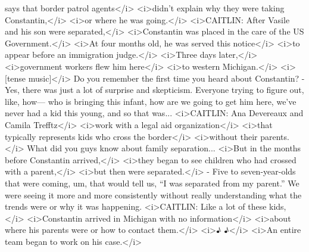 \begin{itemize}
  says that border patrol agents\textless{}/i\textgreater{}
  \textless{}i\textgreater{}didn't explain why they were taking
  Constantin,\textless{}/i\textgreater{} \textless{}i\textgreater{}or
  where he was going.\textless{}/i\textgreater{}
  \textless{}i\textgreater{}CAITLIN: After Vasile and his son were
  separated,\textless{}/i\textgreater{}
  \textless{}i\textgreater{}Constantin was placed in the care of the US
  Government.\textless{}/i\textgreater{} \textless{}i\textgreater{}At
  four months old, he was served this notice\textless{}/i\textgreater{}
  \textless{}i\textgreater{}to appear before an immigration
  judge.\textless{}/i\textgreater{} \textless{}i\textgreater{}Three days
  later,\textless{}/i\textgreater{} \textless{}i\textgreater{}government
  workers flew him here\textless{}/i\textgreater{}
  \textless{}i\textgreater{}to western
  Michigan.\textless{}/i\textgreater{}
  \textless{}i\textgreater{}{[}tense music{]}\textless{}/i\textgreater{}
  Do you remember the first time you heard about Constantin? - Yes,
  there was just a lot of surprise and skepticism. Everyone trying to
  figure out, like, how--- who is bringing this infant, how are we going
  to get him here, we've never had a kid this young, and so that was...
  \textless{}i\textgreater{}CAITLIN: Ana Devereaux and Camila
  Trefftz\textless{}/i\textgreater{} \textless{}i\textgreater{}work with
  a legal aid organization\textless{}/i\textgreater{}
  \textless{}i\textgreater{}that typically represents kids who cross the
  border\textless{}/i\textgreater{} \textless{}i\textgreater{}without
  their parents.\textless{}/i\textgreater{} What did you guys know about
  family separation... \textless{}i\textgreater{}But in the months
  before Constantin arrived,\textless{}/i\textgreater{}
  \textless{}i\textgreater{}they began to see children who had crossed
  with a parent,\textless{}/i\textgreater{}
  \textless{}i\textgreater{}but then were
  separated.\textless{}/i\textgreater{} - Five to seven-year-olds that
  were coming, um, that would tell us, ``I was separated from my
  parent.'' We were seeing it more and more consistently without really
  understanding what the trends were or why it was happening.
  \textless{}i\textgreater{}CAITLIN: Like a lot of these
  kids,\textless{}/i\textgreater{} \textless{}i\textgreater{}Constantin
  arrived in Michigan with no information\textless{}/i\textgreater{}
  \textless{}i\textgreater{}about where his parents were or how to
  contact them.\textless{}/i\textgreater{} \textless{}i\textgreater{}♪
  ♪\textless{}/i\textgreater{} \textless{}i\textgreater{}An entire team
  began to work on his case.\textless{}/i\textgreater{}


\end{itemize}
